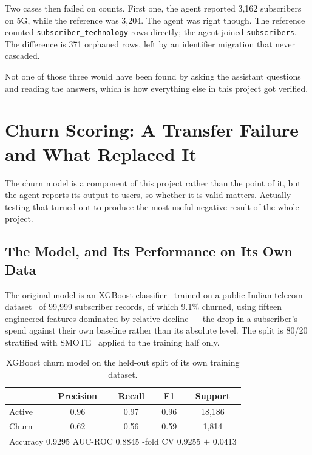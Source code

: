 Two cases then failed on counts. First one, the agent reported 3,162 subscribers 
on 5G, while the reference was 3,204. The agent was right though. The reference counted 
\texttt{subscriber\_technology}  rows directly; the agent joined
\texttt{subscribers}. The difference is 371 orphaned rows, left by an
identifier migration that never cascaded.


Not one of those three would have been found by asking the assistant questions
and reading the answers, which is how everything else in this project got
verified.

\section{Churn Scoring: A Transfer Failure and What Replaced It}

The churn model is a component of this project rather than the point of it, but
the agent reports its output to users, so whether it is valid matters. Actually
testing that turned out to produce the most useful negative result of the whole
project.

\subsection{The Model, and Its Performance on Its Own Data}

The original model is an XGBoost classifier~\cite{xgboost} trained on a public
Indian telecom dataset~\cite{telecom_churn_dataset} of 99{,}999 subscriber records, of which 9.1\% churned,
using fifteen engineered features dominated by relative decline --- the drop in a
subscriber's spend against their own baseline rather than its absolute level. The
split is 80/20 stratified with SMOTE~\cite{smote} applied to the training half only.

\begin{table}[H]
\centering
\begin{tabular}{lcccc}
\toprule
& \textbf{Precision} & \textbf{Recall} & \textbf{F1} & \textbf{Support} \\
\midrule
Active & 0.96 & 0.97 & 0.96 & 18{,}186 \\
Churn  & 0.62 & 0.56 & 0.59 & 1{,}814 \\
\midrule
\multicolumn{5}{l}{Accuracy 0.9295 \quad AUC-ROC 0.8845 \quad 5-fold CV 0.9255 $\pm$ 0.0413} \\
\bottomrule
\end{tabular}
\caption{XGBoost churn model on the held-out split of its own training dataset.}
\label{tab:churn-perf}
\end{table}

